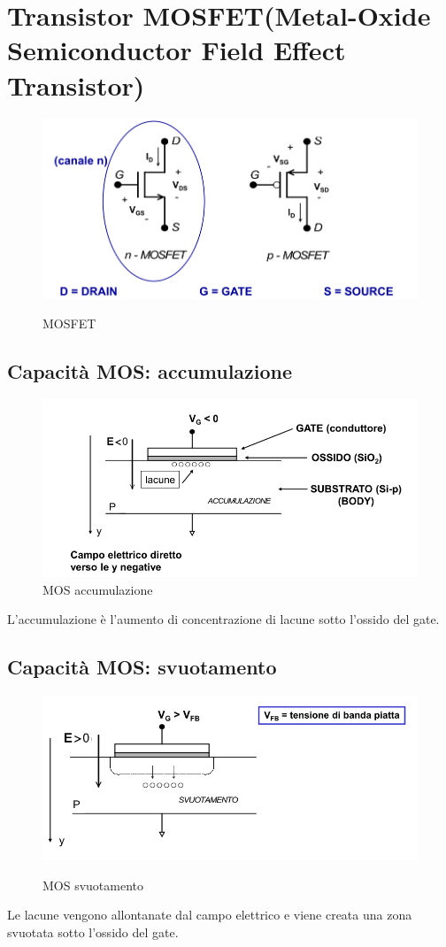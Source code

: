 \section{Transistor MOSFET(Metal-Oxide Semiconductor Field Effect Transistor)}

\begin{figure}[H]
    \centering
    \includegraphics[width=0.5\linewidth]{2 - dispositivi elettronici/imgs/Screenshot from 2022-06-14 23-25-50.png}
\label{fig:MOSFET}
\caption{MOSFET}
\end{figure}

\subsection{Capacità MOS: accumulazione}

\begin{figure}[H]
    \centering
    \includegraphics[width=0.5\linewidth]{2 - dispositivi elettronici/imgs/Screenshot from 2022-06-15 11-23-56.png}
    \caption{MOS accumulazione}
    \label{fig:MOS_acc}
\end{figure}

L'accumulazione è l'aumento di concentrazione di lacune sotto l'ossido del gate.

\subsection{Capacità MOS: svuotamento}

\begin{figure}[H]
    \centering
    \includegraphics[]{2 - dispositivi elettronici/imgs/Screenshot from 2022-06-15 11-30-59.png}
    \label{fig:MOS_svuotamento}
    \caption{MOS svuotamento}
\end{figure}

Le lacune vengono allontanate dal campo elettrico e viene 
creata una zona svuotata sotto l'ossido del gate.
